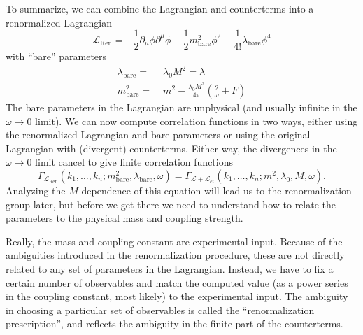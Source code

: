 \documentclass[12pt]{article}
\begin{document}
To summarize, we can combine the Lagrangian and counterterms into a
renormalized Lagrangian
\begin{equation}
  \mathcal{L}_\text{Ren} = 
  -\frac{1}{2} \partial_\mu \phi \partial^\mu \phi
  -\frac{1}{2} m_\text{bare}^2 \phi^2 
  - \frac{1}{4!} \lambda_\text{bare} \phi^4
\end{equation}
with ``bare'' parameters
\begin{equation}
  \begin{split}
    \lambda_\text{bare} =&\; \lambda_0 M^2 = \lambda \\
    m_\text{bare}^2 =&\; 
    m^2 - \frac{\lambda_0 M^2}{4\pi} \left( \frac{2}{\omega} + F\right)
  \end{split}
\end{equation}
The bare parameters in the Lagrangian are unphysical (and usually
infinite in the $\omega\to 0$ limit). We can now compute correlation
functions in two ways, either using the renormalized Lagrangian and
bare parameters or using the original Lagrangian with (divergent)
counterterms. Either way, the divergences in the $\omega\to 0$ limit
cancel to give finite correlation functions
\begin{equation}
  \Gamma_{\mathcal{L}_\text{Ren}}
  (k_1, \dots, k_n; m_\text{bare}^2, \lambda_\text{bare}, \omega) = 
  \Gamma_{\mathcal{L}+\mathcal{L}_\text{ct}}
  (k_1, \dots, k_n; m^2, \lambda_0, M, \omega).
\end{equation}
Analyzing the $M$-dependence of this equation will lead us to the
renormalization group later, but before we get there we need to
understand how to relate the parameters to the physical mass and
coupling strength.

Really, the mass and coupling constant are experimental input. Because
of the ambiguities introduced in the renormalization procedure, these
are not directly related to any set of parameters in the
Lagrangian. Instead, we have to fix a certain number of observables
and match the computed value (as a power series in the coupling
constant, most likely) to the experimental input. The ambiguity in
choosing a particular set of observables is called the
``renormalization prescription'', and reflects the ambiguity in the
finite part of the counterterms.
\end{document}
